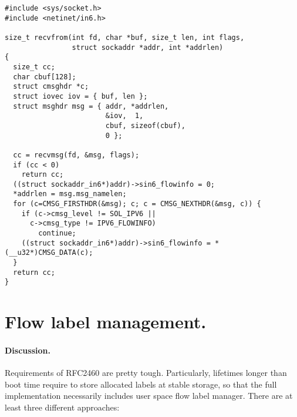 \begin{verbatim}
#include <sys/socket.h>
#include <netinet/in6.h>

size_t recvfrom(int fd, char *buf, size_t len, int flags,
                struct sockaddr *addr, int *addrlen)
{
  size_t cc;
  char cbuf[128];
  struct cmsghdr *c;
  struct iovec iov = { buf, len };
  struct msghdr msg = { addr, *addrlen,
                        &iov,  1,
                        cbuf, sizeof(cbuf),
                        0 };

  cc = recvmsg(fd, &msg, flags);
  if (cc < 0)
    return cc;
  ((struct sockaddr_in6*)addr)->sin6_flowinfo = 0;
  *addrlen = msg.msg_namelen;
  for (c=CMSG_FIRSTHDR(&msg); c; c = CMSG_NEXTHDR(&msg, c)) {
    if (c->cmsg_level != SOL_IPV6 ||
      c->cmsg_type != IPV6_FLOWINFO)
        continue;
    ((struct sockaddr_in6*)addr)->sin6_flowinfo = *(__u32*)CMSG_DATA(c);
  }
  return cc;
}
\end{verbatim}



\section{Flow label management.}

\paragraph{Discussion.}
Requirements of RFC2460 are pretty tough. Particularly, lifetimes
longer than boot time require to store allocated labels at stable
storage, so that the full implementation necessarily includes user space flow
label manager. There are at least three different approaches:


